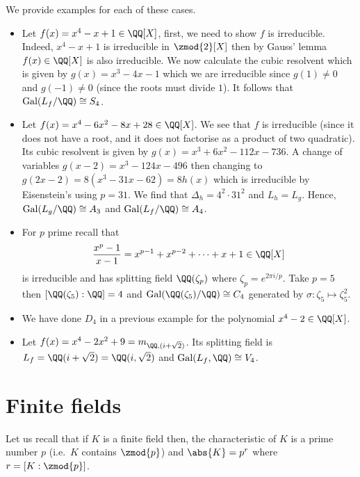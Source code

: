 \documentclass[12pt, a4paper]{article}
\newcommand{\gal}{\text{Gal}}
\begin{document}
\begin{mdexample}
    We provide examples for each of these cases.
    \begin{itemize}
        \item Let \(f(x)= x^4 -x+1 \in \QQ[X]\), first, we need to show \(f\) is irreducible. Indeed, \(x^4-x+1\) is irreducible in \(\zmod{2}[X]\) then by Gauss' lemma \(f(x)\in \QQ[X]\) is also irreducible. We now calculate the cubic resolvent which is given by \(g(x)=x^3 -4x-1\) which we are irreducible since \(g(1)\neq 0\) and \(g(-1)\neq 0\) (since the roots must divide \(1\)). It follows that \(\gal(L_f/\QQ)\cong S_4\). 
        \item Let \(f(x)=x^4-6x^2-8x+28 \in \QQ[X]\). We see that \(f\) is irreducible (since it does not have a root, and it does not factorise as a product of two quadratic). Its cubic resolvent is given by \(g(x)=x^3+6x^2-112x-736\). A change of variables \(g(x-2)= x^3 -124x-496\) then changing to \(g(2x-2)=8(x^3-31x-62)=8h(x)\) which is irreducible by Eisenstein's using \(p=31\). We find that \(\Delta_h=4^2\cdot 31^2\) and \(L_h=L_g\). Hence, \(\gal(L_g/\QQ)\cong A_3\) and \(\gal(L_f/\QQ)\cong A_4\).
        \item For \(p\) prime recall that 
        \[\frac{x^p-1}{x-1}=x^{p-1}+x^{p-2}+\cdots+x+1 \in \QQ[X]\]
        is irreducible and has splitting field \(\QQ(\zeta_p)\) where \(\zeta_p = e^{2\pi i /p}\). Take \(p=5\) then \([\QQ(\zeta_5):\QQ]=4\) and \(\gal(\QQ(\zeta_5)/\QQ)\cong C_4\) generated by \(\sigma:\zeta_5 \mapsto\zeta_5^2\).
        \item We have done \(D_4\) in a previous example for the polynomial \(x^4-2 \in \QQ[X]\).
        \item Let \(f(x)=x^4-2x^2+9 = m_{\QQ,(i+\sqrt{2})}\). Its splitting field is \(L_f = \QQ(i+\sqrt{2})=\QQ(i,\sqrt{2})\) and  \(\gal(L_f,\QQ)\cong V_4\).
    \end{itemize}
\end{mdexample}

\section{Finite fields}

Let us recall that if \(K\) is a finite field then, the characteristic of \(K\) is a prime number \(p\) (i.e.\ \(K\) contains \(\zmod{p}\)) and \(\abs{K}=p^r\) where \(r = [K:\zmod{p}]\).
\end{document}
